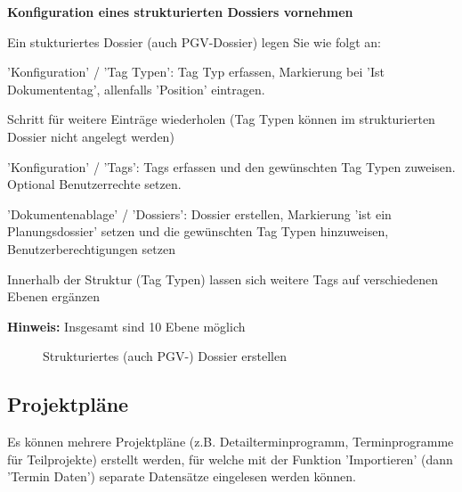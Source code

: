 \textbf{Konfiguration eines strukturierten Dossiers vornehmen}

\vspace{\baselineskip}

Ein stukturiertes Dossier (auch PGV-Dossier) legen Sie wie folgt an:

\vspace{\baselineskip}

\begin{compactitem}
	\item 'Konfiguration' / 'Tag Typen': Tag Typ erfassen, Markierung bei 'Ist Dokumententag', allenfalls 'Position' eintragen.
	\item Schritt für weitere Einträge wiederholen (Tag Typen können im strukturierten Dossier nicht angelegt werden)
	\item 'Konfiguration' / 'Tags': Tags erfassen und den gewünschten Tag Typen zuweisen. Optional Benutzerrechte setzen.
	\item 'Dokumentenablage' / 'Dossiers': Dossier erstellen, Markierung 'ist ein Planungsdossier' setzen und die gewünschten Tag Typen hinzuweisen, Benutzerberechtigungen setzen
	\item Innerhalb der Struktur (Tag Typen) lassen sich weitere Tags auf verschiedenen Ebenen ergänzen
	\item \textbf{Hinweis:} Insgesamt sind 10 Ebene möglich
\end{compactitem}	

\begin{figure}[H]
\caption{Strukturiertes (auch PGV-) Dossier erstellen}
\end{figure}

\subsection{Projektpläne}

Es können mehrere Projektpläne (z.B. Detailterminprogramm, Terminprogramme für Teilprojekte) erstellt werden, für welche mit der Funktion 'Importieren' (dann  'Termin Daten') separate Datensätze eingelesen werden können.

